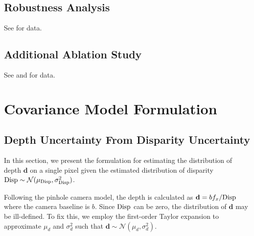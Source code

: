 \subsection{Robustness Analysis}

See  for data.



\subsection{Additional Ablation Study}

\label{sec:macvo:AdditionalAblation}

See  and  for data.





\section{Covariance Model Formulation}
\subsection{Depth Uncertainty From Disparity Uncertainty}
\label{sec:macvo:depthcov}

In this section, we present the formulation for estimating the distribution of depth $\mathbf{d}$ on a single pixel given the estimated distribution of disparity ${\mathrm{Disp}} \sim \mathcal{N}(\mu_{{\mathrm{Disp}}}, \sigma_{\mathrm{Disp}}^2)$.

Following the pinhole camera model, the depth is calculated as $\mathbf{d} = bf_x/{\mathrm{Disp}}$ where the camera baseline is $b$. 
Since ${\mathrm{Disp}}$ can be zero, the distribution of $\mathbf{d}$ may be ill-defined.
To fix this, we employ the first-order Taylor expansion to approximate $\mu_d$ and $\sigma_d^2$ such that $\mathbf{d} \sim \mathcal{N}(\mu_d, \sigma_d^2)$.

